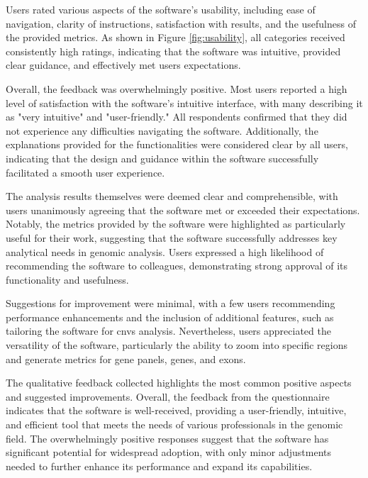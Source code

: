 Users rated various aspects of the software's usability, including ease of navigation, clarity of instructions, satisfaction with results, and the usefulness of the provided metrics. As shown in Figure \ref{fig:usability}, all categories received consistently high ratings, indicating that the software was intuitive, provided clear guidance, and effectively met users expectations.

Overall, the feedback was overwhelmingly positive. Most users reported a high level of satisfaction with the software's intuitive interface, with many describing it as "very intuitive" and "user-friendly." All respondents confirmed that they did not experience any difficulties navigating the software. Additionally, the explanations provided for the functionalities were considered clear by all users, indicating that the design and guidance within the software successfully facilitated a smooth user experience.

The analysis results themselves were deemed clear and comprehensible, with users unanimously agreeing that the software met or exceeded their expectations. Notably, the metrics provided by the software were highlighted as particularly useful for their work, suggesting that the software successfully addresses key analytical needs in genomic analysis. Users expressed a high likelihood of recommending the software to colleagues, demonstrating strong approval of its functionality and usefulness.

Suggestions for improvement were minimal, with a few users recommending performance enhancements and the inclusion of additional features, such as tailoring the software for \ac{cnvs} analysis. Nevertheless, users appreciated the versatility of the software, particularly the ability to zoom into specific regions and generate metrics for gene panels, genes, and exons.

The qualitative feedback collected highlights the most common positive aspects and suggested improvements. Overall, the feedback from the questionnaire indicates that the software is well-received, providing a user-friendly, intuitive, and efficient tool that meets the needs of various professionals in the genomic field. The overwhelmingly positive responses suggest that the software has significant potential for widespread adoption, with only minor adjustments needed to further enhance its performance and expand its capabilities.




